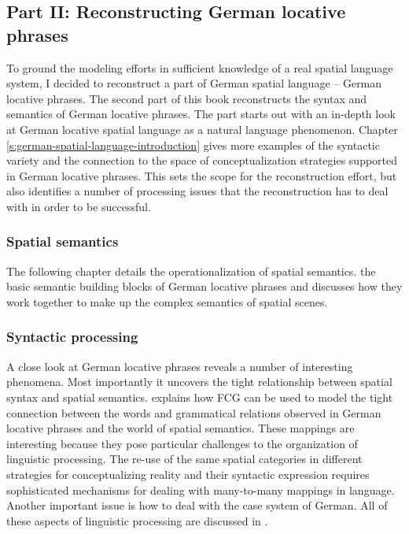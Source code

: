 \subsection{Part II: Reconstructing German locative phrases}
To ground the modeling efforts in sufficient knowledge of a real spatial language system, 
I decided to reconstruct a part of German spatial language -- German locative 
phrases. The second part of this book reconstructs the syntax and semantics 
of German locative phrases. The part starts out with an in-depth look at
German locative spatial language as a natural language phenomenon. Chapter
\ref{s:german-spatial-language-introduction} gives more examples of the syntactic variety and the connection to the
space of conceptualization strategies supported in German locative phrases.
This sets the scope for the reconstruction effort, but also identifies a number
of processing issues that the reconstruction has to deal with in order to be successful.

\subsubsection{Spatial semantics}
The following chapter details the operationalization of spatial semantics. 
 the basic semantic building blocks of German locative phrases
and discusses how they work together to make up the complex 
semantics of spatial scenes.  

\subsubsection{Syntactic processing}
A close look at German locative phrases reveals a number of interesting phenomena.
Most importantly it uncovers the tight relationship between spatial 
syntax and spatial semantics.  
explains how FCG can be used 
to model the tight connection between the words and grammatical 
relations observed in German locative phrases and the world of spatial semantics.
These mappings are interesting because they pose particular challenges to
the organization of linguistic processing. The re-use of the same spatial categories
in different strategies for conceptualizing reality and their syntactic expression
requires sophisticated mechanisms for dealing with many-to-many mappings 
in language. Another important issue is how to deal with the case
system of German. All of these aspects of linguistic processing are
discussed in .

